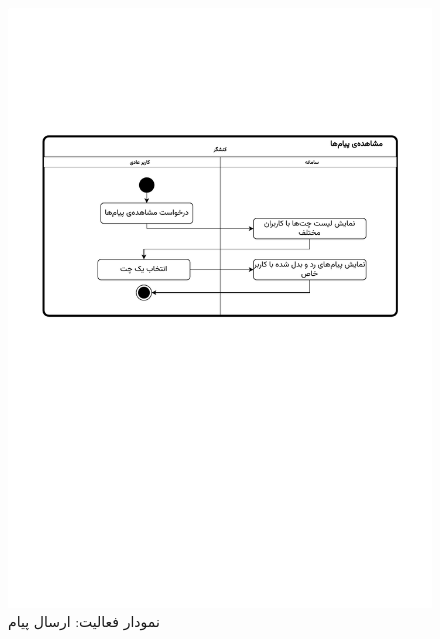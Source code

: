 \begin{figure}[ht!]
	\centering
	\includegraphics[scale=0.8, page=2]{figs/OOD-activity-chat.pdf}
	\caption{نمودار فعالیت: ارسال پیام}
\end{figure}
\FloatBarrier
\newpage

